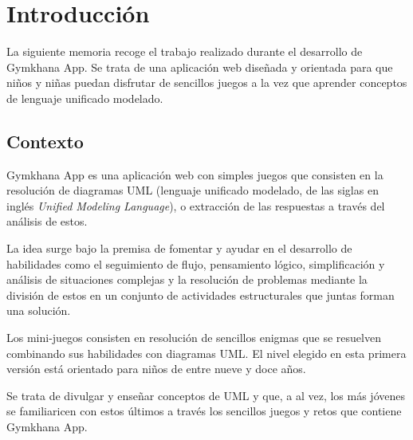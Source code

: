 \documentclass[a4paper, 12pt]{book}
\begin{document}
\tableofcontents 
\cleardoublepage
\listoffigures %



\cleardoublepage
\chapter{Introducción}
\label{sec:intro} %

La siguiente memoria recoge el trabajo realizado durante el desarrollo de Gymkhana App. Se trata de una aplicación web diseñada y orientada para que niños y niñas puedan disfrutar de sencillos juegos a la vez que aprender conceptos de lenguaje unificado modelado.

\section{Contexto}
\label{sec:seccion}
Gymkhana App es una aplicación web con simples juegos que consisten en la resolución de diagramas UML (lenguaje unificado modelado, de las siglas en inglés \emph{Unified Modeling Language}), o extracción de las respuestas a través del análisis de estos. 

La idea surge bajo la premisa de fomentar y ayudar en el desarrollo de habilidades como el seguimiento de flujo, pensamiento lógico, simplificación y análisis de situaciones complejas y la resolución de problemas mediante la división de estos en un conjunto de actividades estructurales que juntas forman una solución. 

Los mini-juegos consisten en resolución de sencillos enigmas que se resuelven combinando sus habilidades con diagramas UML. El nivel elegido en esta primera versión está orientado para niños de entre nueve y doce años. 

Se trata de divulgar y enseñar conceptos de UML y que, a al vez, los más jóvenes se familiaricen con estos últimos a través los sencillos juegos y retos que contiene Gymkhana App. 
\end{document}
